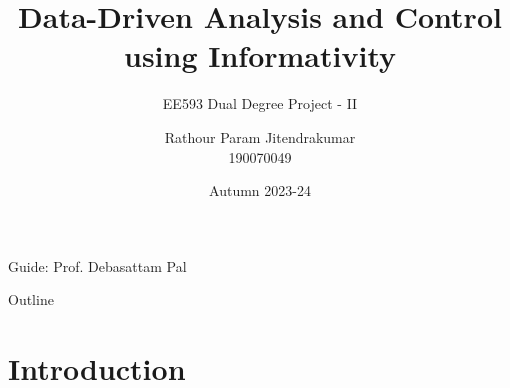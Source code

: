 \documentclass[aspectratio=169, handout, 10pt, hyperref=colorlinks]{beamer}
\title{Data-Driven Analysis and Control using Informativity}
\subtitle{EE593 Dual Degree Project - II}
\author[Param Rathour]{Rathour Param Jitendrakumar\\190070049}
\institute[IIT Bombay]{Department of Electrical Engineering\\
Indian Institute of Technology Bombay} %
\date{Autumn 2023-24}
\begin{document}
\begin{frame}
  \titlepage
  \begin{center}
    Guide: Prof. Debasattam Pal
  \end{center}
\end{frame}

\begin{frame}[allowframebreaks]{Outline}
  \tableofcontents
\end{frame}

\section{Introduction}
\end{document}
